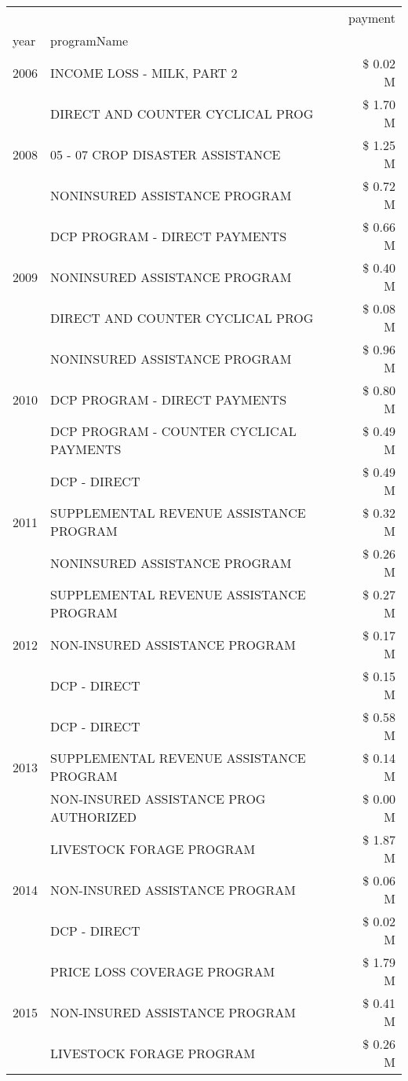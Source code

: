 \begin{tabular}{llr}
\toprule
 &  & payment \\
year & programName &  \\
\midrule
2006 & INCOME LOSS - MILK, PART 2 & \$ 0.02 M \\
\cline{1-3}
\multirow[t]{3}{*}{2008} & DIRECT AND COUNTER CYCLICAL PROG & \$ 1.70 M \\
 & 05 - 07 CROP DISASTER ASSISTANCE & \$ 1.25 M \\
 & NONINSURED ASSISTANCE PROGRAM & \$ 0.72 M \\
\cline{1-3}
\multirow[t]{3}{*}{2009} & DCP PROGRAM - DIRECT PAYMENTS & \$ 0.66 M \\
 & NONINSURED ASSISTANCE PROGRAM & \$ 0.40 M \\
 & DIRECT AND COUNTER CYCLICAL PROG & \$ 0.08 M \\
\cline{1-3}
\multirow[t]{3}{*}{2010} & NONINSURED ASSISTANCE PROGRAM & \$ 0.96 M \\
 & DCP PROGRAM - DIRECT PAYMENTS & \$ 0.80 M \\
 & DCP PROGRAM - COUNTER CYCLICAL PAYMENTS & \$ 0.49 M \\
\cline{1-3}
\multirow[t]{3}{*}{2011} & DCP - DIRECT & \$ 0.49 M \\
 & SUPPLEMENTAL REVENUE ASSISTANCE PROGRAM & \$ 0.32 M \\
 & NONINSURED ASSISTANCE PROGRAM & \$ 0.26 M \\
\cline{1-3}
\multirow[t]{3}{*}{2012} & SUPPLEMENTAL REVENUE ASSISTANCE PROGRAM & \$ 0.27 M \\
 & NON-INSURED ASSISTANCE PROGRAM & \$ 0.17 M \\
 & DCP - DIRECT & \$ 0.15 M \\
\cline{1-3}
\multirow[t]{3}{*}{2013} & DCP - DIRECT & \$ 0.58 M \\
 & SUPPLEMENTAL REVENUE ASSISTANCE PROGRAM & \$ 0.14 M \\
 & NON-INSURED ASSISTANCE PROG AUTHORIZED & \$ 0.00 M \\
\cline{1-3}
\multirow[t]{3}{*}{2014} & LIVESTOCK FORAGE PROGRAM & \$ 1.87 M \\
 & NON-INSURED ASSISTANCE PROGRAM & \$ 0.06 M \\
 & DCP - DIRECT & \$ 0.02 M \\
\cline{1-3}
\multirow[t]{3}{*}{2015} & PRICE LOSS COVERAGE PROGRAM & \$ 1.79 M \\
 & NON-INSURED ASSISTANCE PROGRAM & \$ 0.41 M \\
 & LIVESTOCK FORAGE PROGRAM & \$ 0.26 M \\

\end{tabular}
